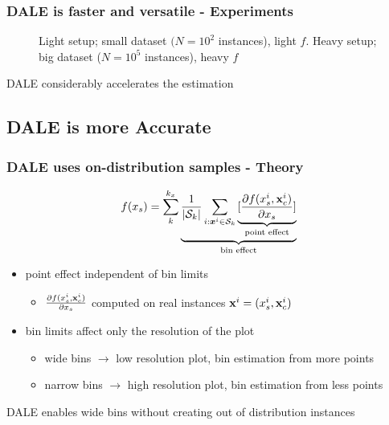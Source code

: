 \begin{frame}
  \frametitle{DALE is faster and versatile - Experiments}
  \begin{figure}[h]
    \centering
    \resizebox{.4\columnwidth}{!}{}
    \resizebox{.43\columnwidth}{!}{}
    \caption[Case-1-fig-1]{Light setup; small dataset \((N=10^2\) instances), light \(f\). Heavy setup; big dataset (\(N=10^5\) instances), heavy \(f\)}
    \label{fig:case-1-plots-1}
  \end{figure}

  \noindent\makebox[\linewidth]{\rule{\paperwidth}{0.4pt}}
  DALE considerably accelerates the estimation
\end{frame}


\subsection{DALE is more Accurate}

\begin{frame}
  \frametitle{DALE uses on-distribution samples - Theory}
  \[f(x_s) = \sum_k^{k_x} \underbrace{\frac{1}{|\mathcal{S}_k|}
    \sum_{i:\boldsymbol{x}^i \in \mathcal{S}_k} \underbrace{[\frac{\partial
          f(x_s^i, \mathbf{x}^i_c)}{\partial x_s}]}_{\text{point
        effect}}}_{\text{bin effect}} \]

  \begin{itemize}
  \item point effect \alert{independent} of bin limits
    \begin{itemize}
    \item \(\frac{\partial f(x_s^i, \mathbf{x}^i_c)}{\partial x_s}\)
      computed on real instances \(\mathbf{x}^i = (x_s^i, \mathbf{x}_c^i)\)
    \end{itemize}
  \item bin limits affect only the \alert{resolution} of the plot
    \begin{itemize}
    \item wide bins \(\rightarrow\) low resolution plot, bin
      estimation from more points
    \item narrow bins \(\rightarrow\) high resolution plot, bin
      estimation from less points
    \end{itemize}
  \end{itemize}
  DALE enables wide bins without creating out of distribution instances
\end{frame}


